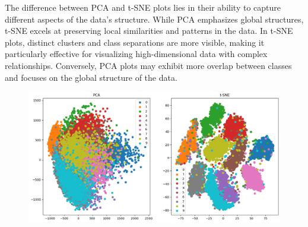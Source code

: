 \documentclass[a4paper,11pt]{article}
\begin{document}
\begin{mlsolution}
The difference between PCA and t-SNE plots lies in their ability to capture different aspects of the data's structure. While PCA emphasizes global structures, t-SNE excels at preserving local similarities and patterns in the data. In t-SNE plots, distinct clusters and class separations are more visible, making it particularly effective for visualizing high-dimensional data with complex relationships. Conversely, PCA plots may exhibit more overlap between classes and focuses on the global structure of the data.
\begin{figure}[H]
	\centering
	\includegraphics[width=1\linewidth]{3.1.png}
	\label{fig:3.1}
\end{figure}
\end{mlsolution}
\end{document}
